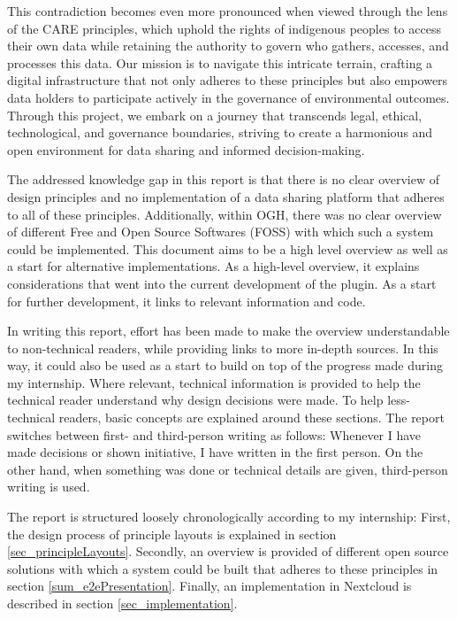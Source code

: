 \documentclass[journal, dvipsnames]{IEEEtran}
\begin{document}
This contradiction becomes even more pronounced when viewed through the lens of the CARE principles, which uphold the rights of indigenous peoples to access their own data while retaining the authority to govern who gathers, accesses, and processes this data. Our mission is to navigate this intricate terrain, crafting a digital infrastructure that not only adheres to these principles but also empowers data holders to participate actively in the governance of environmental outcomes. Through this project, we embark on a journey that transcends legal, ethical, technological, and governance boundaries, striving to create a harmonious and open environment for data sharing and informed decision-making.

The addressed knowledge gap in this report is that there is no clear overview of design principles and no implementation of a data sharing platform that adheres to all of these principles. Additionally, within OGH, there was no clear overview of different Free and Open Source Softwares (FOSS) with which such a system could be implemented. This document aims to be a high level overview as well as a start for alternative implementations. As a high-level overview, it explains considerations that went into the current development of the plugin. As a start for further development, it links to relevant information and code.

In writing this report, effort has been made to make the overview understandable to non-technical readers, while providing links to more in-depth sources. In this way, it could also be used as a start to build on top of the progress made during my internship. Where relevant, technical information is provided to help the technical reader understand why design decisions were made. To help less-technical readers, basic concepts are explained around these sections. The report switches between first- and third-person writing as follows: Whenever I have made decisions or shown initiative, I have written in the first person. On the other hand, when something was done or technical details are given, third-person writing is used.

The report is structured loosely chronologically according to my internship: First, the design process of principle layouts is explained in section \ref{sec_principleLayouts}. Secondly, an overview is provided of different open source solutions with which a system could be built that adheres to these principles in section \ref{sum_e2ePresentation}. Finally, an implementation in Nextcloud is described in section \ref{sec_implementation}.
\end{document}
